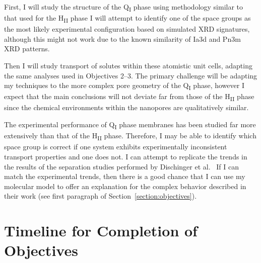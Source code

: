 \documentclass{article}
\begin{document}
  First, I will study the structure of the Q\textsubscript{I} phase using
  methodology similar to that used for the H\textsubscript{II} phase 
  I will attempt to identify one of the space groups as the most likely
  experimental configuration based on simulated XRD signatures, although
  this might not work due to the known similarity of Ia3d and Pn3m XRD 
  patterns.
  
  Then I will study transport of solutes within these atomistic unit cells, 
  adapting the same analyses used in Objectives 2--3. The primary 
  challenge will be adapting my techniques to the more complex pore geometry
  of the Q\textsubscript{I} phase, however I expect that the main conclusions
  will not deviate far from those of the H\textsubscript{II} phase since
  the chemical environments within the nanopores are qualitatively similar. 
  
  The experimental performance of Q\textsubscript{I} phase membranes has been
  studied far more extensively than that of the H\textsubscript{II} phase. 
  Therefore, I may be able to identify which space group is correct if
  one system exhibits experimentally inconsistent transport properties and one
  does not. I can attempt to replicate the trends in the results of the separation
  studies performed by Dischinger et al.~\cite{dischinger_application_2017} If
  I can match the experimental trends, then there is a good chance that I can
  use my molecular model to offer an explanation for the complex behavior described
  in their work (see first paragraph of Section~\ref{section:objectives}).


%  
%  

  \section{Timeline for Completion of Objectives}\label{section:timeline}
\end{document}

